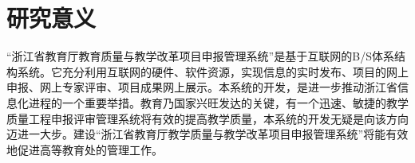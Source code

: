 
\chapter{研究意义}
“浙江省教育厅教育质量与教学改革项目申报管理系统”是基于互联网的B/S体系结构系统。它充分利用互联网的硬件、软件资源，实现信息的实时发布、项目的网上申报、网上专家评审、项目成果网上展示。本系统的开发，是进一步推动浙江省信息化进程的一个重要举措。教育乃国家兴旺发达的关键，有一个迅速、敏捷的教学质量工程申报评审管理系统将有效的提高教学质量，本系统的开发无疑是向该方向迈进一大步。建设“浙江省教育厅教学质量与教学改革项目申报管理系统”将能有效地促进高等教育处的管理工作。

